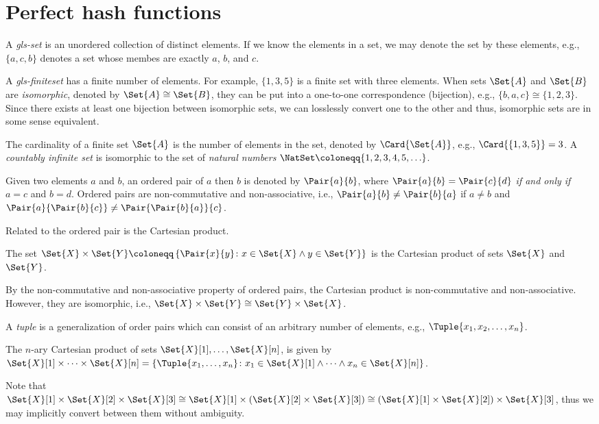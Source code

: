 \documentclass[ ../main.tex]{subfiles}
\begin{document}
\section{Perfect hash functions}
A \emph{\gls{gls-set}} is an unordered collection of distinct elements.
If we know the elements in a set, we may denote the set by these elements, e.g., $\{a,c,b\}$ denotes a set whose membes are exactly $a$, $b$, and $c$.

A \emph{\gls{gls-finiteset}} has a finite number of elements.
For example, $\{ 1, 3, 5 \}$ is a finite set with three elements.
When sets $\Set{A}$ and $\Set{B}$ are \emph{isomorphic}, denoted by $\Set{A} 
\cong \Set{B}$, they can be put into a one-to-one correspondence (bijection), e.g., $\{b,a,c\} \cong \{1,2,3\}$.
Since there exists at least one bijection between isomorphic sets, we can losslessly convert one to the other and thus, isomorphic sets are in some sense equivalent.

The cardinality of a finite set $\Set{A}$ is the number of elements in the set, denoted by $\Card{\Set{A}}$, e.g., $\Card{\left\{ 1, 3, 5\right\}} = 3$.
A \emph{countably infinite set} is isomorphic to the set of \emph{natural numbers} $\NatSet \coloneqq \{1,2,3,4,5,\ldots\}$.

Given two elements $a$ and $b$, an ordered pair of $a$ then $b$ is denoted by $\Pair{a}{b}$, where $\Pair{a}{b} = \Pair{c}{d}$ \emph{if and only if} $a = c$ and $b = d$.
Ordered pairs are non-commutative and non-associative, i.e., $\Pair{a}{b} \neq \Pair{b}{a}$ if $a \neq b$ and $\Pair{a}{\Pair{b}{c}} \neq \Pair{\Pair{b}{a}}{c}$.

Related to the ordered pair is the Cartesian product.
\begin{definition}
The set $\Set{X} \times \Set{Y} \coloneqq \left\{\Pair{x}{y} \colon x \in 
\Set{X} \land y \in \Set{Y}\right\}$ is the Cartesian product of sets $\Set{X}$ 
and $\Set{Y}$.
\end{definition}
By the non-commutative and non-associative property of ordered pairs, the Cartesian product is non-commutative and non-associative.
However, they are isomorphic, i.e., $\Set{X} \times \Set{Y} \cong \Set{Y} \times \Set{X}$.

A \emph{tuple} is a generalization of order pairs which can consist of an arbitrary number of elements, e.g., $\Tuple{x_1,x_2,\ldots,x_n}$.
\begin{definition}
The $n$-ary Cartesian product of sets $\Set{X}[1],\ldots,\Set{X}[n]$, is given by $\Set{X}[1] \times \cdots \times \Set{X}[n] = \left\{\Tuple{x_1,\ldots,x_n} \colon x_1 \in \Set{X}[1] \land \cdots \land x_n \in \Set{X}[n]\right\}$.
\end{definition}
Note that $\Set{X}[1] \times \Set{X}[2] \times \Set{X}[3] \cong \Set{X}[1] \times \left(\Set{X}[2] \times \Set{X}[3]\right) \cong \left(\Set{X}[1] \times \Set{X}[2]\right) \times \Set{X}[3]$, thus we may implicitly convert between them without ambiguity.
\end{document}
